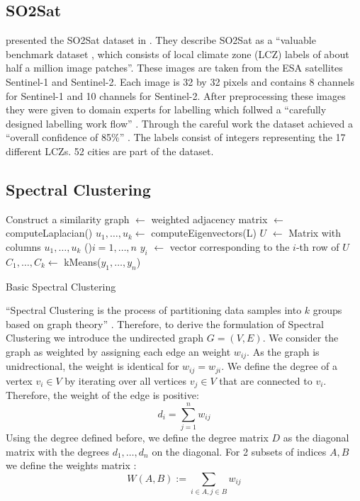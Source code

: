 \subsection{SO2Sat}
\label{subsec:so2sat}
\citeauthor{zhu_so2sat_2019} presented the SO2Sat dataset in \cite{zhu_so2sat_2019}. They describe SO2Sat as a \enquote{valuable benchmark dataset \textelp{}, which consists of local climate zone (LCZ) labels of about half a million \textelp{} image patches}.
These images are taken from the ESA satellites Sentinel-1 and Sentinel-2. Each image is 32 by 32 pixels and contains 8 channels for Sentinel-1 and 10 channels for Sentinel-2.
After preprocessing these images they were given to domain experts for labelling which follwed a \enquote{carefully designed labelling work flow} \cite{zhu_so2sat_2019}.
Through the careful work the dataset achieved a \enquote{overall confidence of 85\%} \cite{zhu_so2sat_2019}.
The labels consist of integers representing the 17 different \glspl{LCZ}. 52 cities are part of the dataset.

\subsection{Spectral Clustering}
\label{subsec:spectral_clustering}

\begin{algorithm}[b]
  Construct a similarity graph\;
  \Adj \(\leftarrow\) weighted adjacency matrix\;
  \Laplace \(\leftarrow\) computeLaplacian(\Adj)\;
  \(u_1, \ldots, u_k \leftarrow\) computeEigenvectors(L)\;
  \(U\) \(\leftarrow\) Matrix with columns \(u_1, \ldots, u_k\)\;
  \ForEach(){\(i = 1, \ldots, n\)}{
    \(y_i\) \(\leftarrow\) vector corresponding to the \(i\)-th row of \(U\)
  }
\(C_1, \ldots, C_k \leftarrow\) kMeans(\(y_1, \ldots, y_n\))\;

  \caption{Basic Spectral Clustering}\label{alg:basic_spectral}
 \end{algorithm}

\enquote{Spectral Clustering is the process of partitioning data samples into
\(k\) groups based on graph theory} \cite{krajsek_helmholtz_nodate}. Therefore,
to derive the formulation of Spectral Clustering we introduce the undirected graph \(G=(V, E)\).
We consider the graph as weighted by assigning each edge an weight \(w_{ij}\). As the graph
is unidrectional, the weight is identical for \(w_{ij} = w_{ji} \).
We define the degree of a vertex \(v_i \in V\) by iterating over all vertices \(v_j \in V\) that are connected to \(v_i\).
Therefore, the weight of the edge is positive:
\[d_i = \sum_{j=1}^n w_{ij}\]
Using the degree defined before, we define the degree matrix \(D\) as the diagonal matrix with the degrees \(d_1, \ldots, d_n\) on the diagonal.
\cite{von_luxburg_tutorial_2007}
For 2 subsets of indices \(A, B\) we define the weights matrix \cite{von_luxburg_tutorial_2007}:
\[W(A, B) := \sum_{i \in A, j \in B} w_{ij}\]


